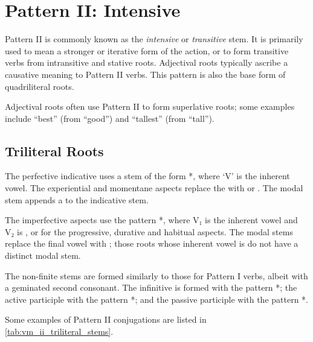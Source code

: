 \documentclass[grammar]{subfiles}
\begin{document}
\section{Pattern II: Intensive}
\label{sec:vm_pattern_ii}

Pattern II is commonly known as the \emph{intensive} or \emph{transitive} stem.
It is primarily used to mean a stronger or iterative form of the action, or to
form transitive verbs from intransitive and stative roots.  Adjectival roots
typically ascribe a causative meaning to Pattern II verbs.  This pattern is
also the base form of quadriliteral roots. 

%

Adjectival roots often use Pattern II to form superlative roots; some examples
include  “best” (from  “good”) and  “tallest” (from
 “tall”).  


\subsection{Triliteral Roots}
\label{ssec:vm_ii_triliteral}

The perfective indicative uses a stem of the form *, where ‘V’ is
the inherent vowel.  The experiential and momentane aspects replace the 
with  or .  The modal stem appends a  to the indicative
stem. 

The imperfective aspects use the pattern *, where V₁ is the
inherent vowel and V₂ is ,  or  for the progressive,
durative and habitual aspects. The modal stems replace the final vowel with
; those roots whose inherent vowel is  do not have a distinct
modal stem.  

The non-finite stems are formed similarly to those for Pattern I verbs, albeit
with a geminated second consonant.  The infinitive is formed with the pattern
*; the active participle with the pattern *; and
the passive participle with the pattern *.

Some examples of Pattern II conjugations are listed in \cref{tab:vm_ii_triliteral_stems}.
\end{document}
